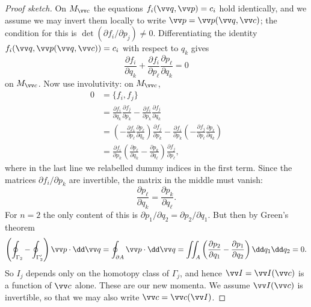 \begin{proof}[Proof sketch]
	On $M_{\vv c}$ the equations $f_i(\vv q, \vv p) = c_i$ hold identically, and we assume we may invert them locally to write $\vv p = \vv p(\vv q, \vv c)$; the condition for this is $\det(\partial f_i/\partial p_j)\neq 0$. Differentiating the identity $f_i(\vv q, \vv p(\vv q, \vv c)) = c_i$ with respect to $q_k$ gives
	$$
	\frac{\partial f_i}{\partial q_k} + \frac{\partial f_i}{\partial p_\ell}\frac{\partial p_\ell}{\partial q_k} = 0
	$$
	on $M_{\vv c}$. Now use involutivity: on $M_{\vv c}$,
	\begin{align*}
		0 &= \{f_i, f_j\}\\
		&= \frac{\partial f_i}{\partial q_k}\frac{\partial f_j}{\partial p_k} - \frac{\partial f_i}{\partial p_k}\frac{\partial f_j}{\partial q_k}\\
		&= \left(-\frac{\partial f_i}{\partial p_\ell}\frac{\partial p_\ell}{\partial q_k}\right)\frac{\partial f_j}{\partial p_k} - \frac{\partial f_i}{\partial p_k}\left(-\frac{\partial f_j}{\partial p_\ell}\frac{\partial p_\ell}{\partial q_k}\right)\\
		&= \frac{\partial f_i}{\partial p_k}\left(\frac{\partial p_\ell}{\partial q_k} - \frac{\partial p_k}{\partial q_\ell}\right)\frac{\partial f_j}{\partial p_\ell},
	\end{align*}
	where in the last line we relabelled dummy indices in the first term. Since the matrices $\partial f_i/\partial p_k$ are invertible, the matrix in the middle must vanish:
	$$
	\frac{\partial p_\ell}{\partial q_k} = \frac{\partial p_k}{\partial q_\ell}.
	$$
	For $n = 2$ the only content of this is $\partial p_1/\partial q_2 = \partial p_2/\partial q_1$. But then by Green's theorem
	$$
	\left(\oint_{\Gamma_2} - \oint_{\Gamma_2'}\right)\vv p\cdot\dd\vv q = \oint_{\partial A}\vv p\cdot\dd\vv q = \iint_A\left(\frac{\partial p_2}{\partial q_1} - \frac{\partial p_1}{\partial q_2}\right)\dd q_1 \dd q_2 = 0.
	$$
	So $I_j$ depends only on the homotopy class of $\Gamma_j$, and hence $\vv I = \vv I(\vv c)$ is a function of $\vv c$ alone. These are our new momenta. We assume $\vv I(\vv c)$ is invertible, so that we may also write $\vv c = \vv c(\vv I)$.


\end{proof}
